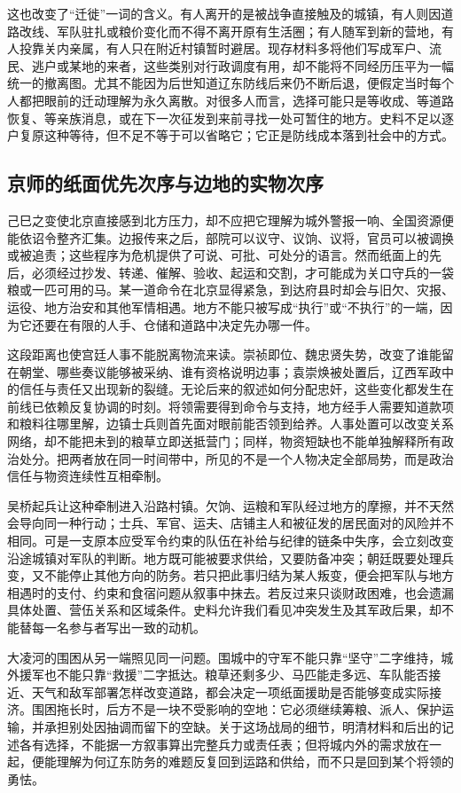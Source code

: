 这也改变了“迁徙”一词的含义。有人离开的是被战争直接触及的城镇，有人则因道路改线、军队驻扎或粮价变化而不得不离开原有生活圈；有人随军到新的营地，有人投靠关内亲属，有人只在附近村镇暂时避居。现存材料多将他们写成军户、流民、逃户或某地的来者，这些类别对行政调度有用，却不能将不同经历压平为一幅统一的撤离图。尤其不能因为后世知道辽东防线后来仍不断后退，便假定当时每个人都把眼前的迁动理解为永久离散。对很多人而言，选择可能只是等收成、等道路恢复、等亲族消息，或在下一次征发到来前寻找一处可暂住的地方。史料不足以逐户复原这种等待，但不足不等于可以省略它；它正是防线成本落到社会中的方式。

\subsection{京师的纸面优先次序与边地的实物次序}

己巳之变使北京直接感到北方压力，却不应把它理解为城外警报一响、全国资源便能依诏令整齐汇集。边报传来之后，部院可以议守、议饷、议将，官员可以被调换或被追责；这些程序为危机提供了可说、可批、可处分的语言。然而纸面上的先后，必须经过抄发、转递、催解、验收、起运和交割，才可能成为关口守兵的一袋粮或一匹可用的马。某一道命令在北京显得紧急，到达府县时却会与旧欠、灾报、运役、地方治安和其他军情相遇。地方不能只被写成“执行”或“不执行”的一端，因为它还要在有限的人手、仓储和道路中决定先办哪一件。

这段距离也使宫廷人事不能脱离物流来读。崇祯即位、魏忠贤失势，改变了谁能留在朝堂、哪些奏议能够被采纳、谁有资格说明边事；袁崇焕被处置后，辽西军政中的信任与责任又出现新的裂缝。无论后来的叙述如何分配忠奸，这些变化都发生在前线已依赖反复协调的时刻。将领需要得到命令与支持，地方经手人需要知道款项和粮料往哪里解，边镇士兵则首先面对眼前能否领到给养。人事处置可以改变关系网络，却不能把未到的粮草立即送抵营门；同样，物资短缺也不能单独解释所有政治处分。把两者放在同一时间带中，所见的不是一个人物决定全部局势，而是政治信任与物资连续性互相牵制。

吴桥起兵让这种牵制进入沿路村镇。欠饷、运粮和军队经过地方的摩擦，并不天然会导向同一种行动；士兵、军官、运夫、店铺主人和被征发的居民面对的风险并不相同。可是一支原本应受军令约束的队伍在补给与纪律的链条中失序，会立刻改变沿途城镇对军队的判断。地方既可能被要求供给，又要防备冲突；朝廷既要处理兵变，又不能停止其他方向的防务。若只把此事归结为某人叛变，便会把军队与地方相遇时的支付、约束和食宿问题从叙事中抹去。若反过来只谈财政困难，也会遗漏具体处置、营伍关系和区域条件。史料允许我们看见冲突发生及其军政后果，却不能替每一名参与者写出一致的动机。

大凌河的围困从另一端照见同一问题。围城中的守军不能只靠“坚守”二字维持，城外援军也不能只靠“救援”二字抵达。粮草还剩多少、马匹能走多远、车队能否接近、天气和敌军部署怎样改变道路，都会决定一项纸面援助是否能够变成实际接济。围困拖长时，后方不是一块不受影响的空地：它必须继续筹粮、派人、保护运输，并承担别处因抽调而留下的空缺。关于这场战局的细节，明清材料和后出的记述各有选择，不能据一方叙事算出完整兵力或责任表；但将城内外的需求放在一起，便能理解为何辽东防务的难题反复回到运路和供给，而不只是回到某个将领的勇怯。

